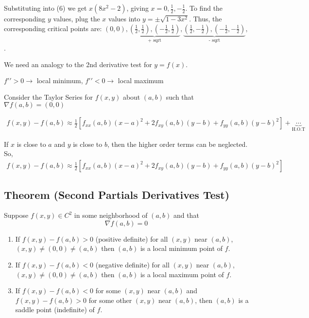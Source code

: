 Substituting into (6) we get $ x(8x^2-2) $, giving 
$ x=0,\frac{1}{2},-\frac{1}{2} $. To find the corresponding $ y $ values,
plug the $ x $ values into $ y=\pm \sqrt{1-3x^2} $. Thus, the corresponding
critical points are: 
$ (0,0),
\underbrace{(\frac{1}{2},\frac{1}{2}),(-\frac{1}{2},\frac{1}{2})}_
{\text{+ sqrt}},
\underbrace{(\frac{1}{2},-\frac{1}{2}),(-\frac{1}{2},-\frac{1}{2})}_
{\text{- sqrt}},$. 

We need an analogy to the 2nd derivative test for $ y=f(x) $.

$ f\prime\prime>0 \rightarrow$ local minimum, 
$ f\prime\prime<0 \rightarrow$ local maximum

Consider the Taylor Series for $ f(x,y) $ about $ (a,b) $ such that 
$ \nabla f(a,b)=(0,0) $

\begin{align} 
    f(x,y)-f(a,b)\approx
    \frac{1}{2} \left[f_{xx}(a,b)(x-a)^2+2f_{x y}(a,b)(y-b)+f_{yy}(a,b)(y-b)^2\right]+
    \underbrace{\cdots}_{\text{H.O.T}}
\end{align}

If $ x $ is close to $ a $ and $ y $ is close to $ b $, then the
higher order terms can be neglected. So,
\begin{align}
    f(x,y)-f(a,b)\approx 
\frac{1}{2} \left[f_{xx}(a,b)(x-a)^2+2f_{x y}(a,b)(y-b)+f_{yy}(a,b)(y-b)^2\right]
\end{align}

\begin{thmbox}
    \subsection{Theorem (Second Partials Derivatives Test)}
    Suppose $ f(x,y)\in C^2 $ in some neighborhood of $ (a,b) $ 
    and that
    \[ \nabla f(a,b)=0 \]

    \begin{enumerate}[(1)]
        \item If $ f(x,y)-f(a,b)>0 $ (positive definite) for all 
        $ (x,y) $ near $ (a,b) $, $ (x,y)\neq(0,0)\neq(a,b) $ 
        then $ (a,b) $ is a local minimum point of $ f $.
        \item If $ f(x,y)-f(a,b)<0 $ (negative definite) for all 
        $ (x,y) $ near $ (a,b) $, $ (x,y)\neq(0,0)\neq(a,b) $ 
        then $ (a,b) $ is a local maximum point of $ f $.
        \item If  $ f(x,y)-f(a,b)< 0 $ for some $ (x,y) $ near $ (a,b) $ and
        $ f(x,y)-f(a,b)> 0 $ for some other $ (x,y) $ near $ (a,b) $, then
        $ (a,b) $ is a saddle point (indefinite) of $ f $.
    \end{enumerate}
\end{thmbox}